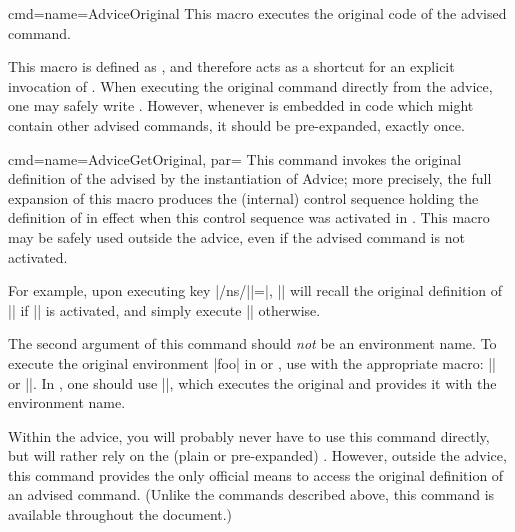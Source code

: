 \documentclass[a4paper,11pt]{article}
\begin{document}
\begin{doc}{cmd={name=AdviceOriginal}}
  This macro executes the original code of the advised command.

  This macro is defined as ,
  and therefore acts as a shortcut for an explicit invocation of
  .  When executing the original command directly from
  the advice, one may safely write .  However, whenever
   is embedded in code which might contain other advised
  commands, it should be pre-expanded, exactly once.
\end{doc}

\begin{doc}{cmd={name=AdviceGetOriginal, par=}}
  This command invokes the original definition of the 
  advised by the  instantiation of Advice; more precisely, the
  full expansion of this macro produces the (internal) control sequence holding
  the definition of  in effect when this control
  sequence was activated in .  This macro may be safely used
  outside the advice, even if the advised command is not activated.

  For example, upon executing key |/ns/||=|,
  || will recall the original definition of |\foo|
  if |\foo| is activated, and simply execute |\foo| otherwise.

  The second argument of this command should \emph{not} be an environment name.
  To execute the original environment |foo| in  or
  , use  with the appropriate macro:
  || or ||.  In
  , one should use ||, which
    executes the original  and provides it with the environment
    name. 

  Within the advice, you will probably never have to use this command directly,
  but will rather rely on the (plain or pre-expanded) .
  However, outside the advice, this command provides the only official means to
  access the original definition of an advised command.  (Unlike the
  commands described above, this command is available throughout the
  document.)
  

\end{doc}
\end{document}
